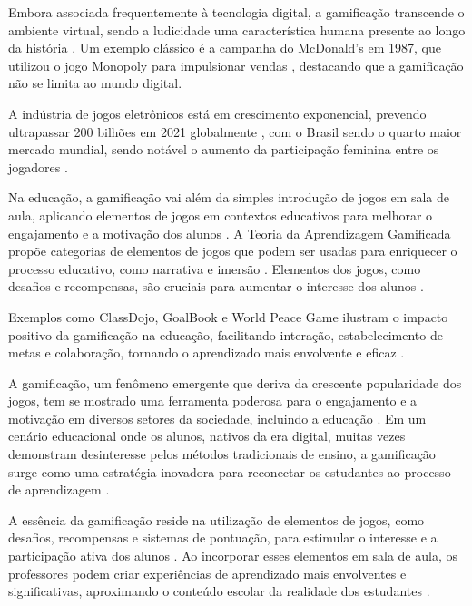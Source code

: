 Embora associada frequentemente à tecnologia digital, a gamificação transcende o ambiente virtual, sendo a ludicidade uma característica humana presente ao longo da história \cite{santaella2007}. Um exemplo clássico é a campanha do McDonald's em 1987, que utilizou o jogo Monopoly para impulsionar vendas \cite{chou}, destacando que a gamificação não se limita ao mundo digital.

A indústria de jogos eletrônicos está em crescimento exponencial, prevendo ultrapassar 200 bilhões em 2021 globalmente \cite{digicapital}, com o Brasil sendo o quarto maior mercado mundial, sendo notável o aumento da participação feminina entre os jogadores \cite{agenciafirma}.

Na educação, a gamificação vai além da simples introdução de jogos em sala de aula, aplicando elementos de jogos em contextos educativos para melhorar o engajamento e a motivação dos alunos \cite{landers2014}. A Teoria da Aprendizagem Gamificada propõe categorias de elementos de jogos que podem ser usadas para enriquecer o processo educativo, como narrativa e imersão \cite{landers2014}. Elementos dos jogos, como desafios e recompensas, são cruciais para aumentar o interesse dos alunos \cite{elias2012}.

Exemplos como ClassDojo, GoalBook e World Peace Game ilustram o impacto positivo da gamificação na educação, facilitando interação, estabelecimento de metas e colaboração, tornando o aprendizado mais envolvente e eficaz \cite{landers2017}.

A gamificação, um fenômeno emergente que deriva da crescente popularidade dos jogos, tem se mostrado uma ferramenta poderosa para o engajamento e a motivação em diversos setores da sociedade, incluindo a educação \cite{alves2014gamificacao}. Em um cenário educacional onde os alunos, nativos da era digital, muitas vezes demonstram desinteresse pelos métodos tradicionais de ensino, a gamificação surge como uma estratégia inovadora para reconectar os estudantes ao processo de aprendizagem \cite{alves2014gamificacao}.

A essência da gamificação reside na utilização de elementos de jogos, como desafios, recompensas e sistemas de pontuação, para estimular o interesse e a participação ativa dos alunos \cite{kapp2012gamification}. Ao incorporar esses elementos em sala de aula, os professores podem criar experiências de aprendizado mais envolventes e significativas, aproximando o conteúdo escolar da realidade dos estudantes \cite{tolomei2017gamificacao}.

